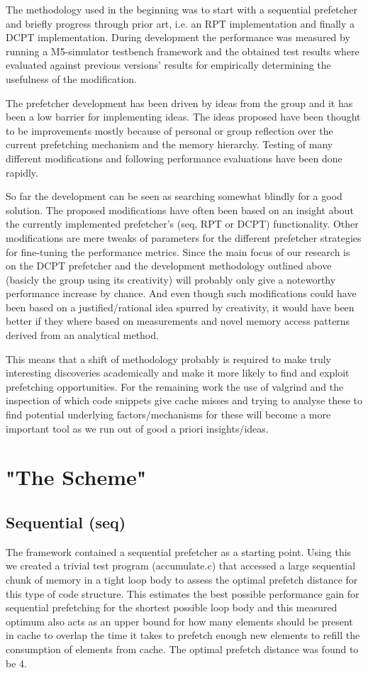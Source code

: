 \documentclass[12pt,journal,compsoc]{IEEEtran}
\begin{document}
The methodology used in the beginning was to start with a sequential
prefetcher and briefly progress through prior art, i.e. an RPT implementation
and finally a DCPT implementation. During development the performance was
measured by running a M5-simulator testbench framework and the obtained test
results where evaluated against previous versions' results for
empirically determining the usefulness of the modification.

The prefetcher development has been driven by ideas from the group and it
has been a low barrier for implementing ideas. The ideas proposed have been
thought to be improvements mostly because of personal or group reflection over
the current prefetching mechanism and the memory hierarchy. Testing of
many different modifications and following performance evaluations have been
done rapidly.

So far the development can be seen as searching somewhat blindly for a good
solution. The proposed modifications have often been based on an insight
about the currently implemented prefetcher's (seq, RPT or DCPT) functionality.
Other modifications are mere tweaks of parameters for the different prefetcher
strategies for fine-tuning the performance metrics. Since the main focus of
our research is on the DCPT prefetcher and the development methodology
outlined above (basicly the group using its creativity) will probably only
give a noteworthy performance increase by chance. And even though such
modifications could have been based on a justified/rational idea spurred by
creativity, it would have been better if they where based on measurements and
novel memory access patterns derived from an analytical method.

This means that a shift of methodology probably is required to make truly
interesting discoveries academically and make it more likely to find and
exploit prefetching opportunities. For the remaining work the use of valgrind
and the inspection of which code snippets give cache misses and trying to
analyse these to find potential underlying factors/mechanisms for these
will become a more important tool as we run out of good a priori
insights/ideas.

\section{"The Scheme"}
\subsection{Sequential (seq)}
The framework contained a sequential prefetcher as a starting point.
Using this we created a trivial test program (accumulate.c) that accessed
a large sequential chunk of memory in a tight loop body to assess the
optimal prefetch distance for this type of code structure.
This estimates the best possible performance gain for sequential
prefetching for the shortest possible loop body and this
measured optimum also acts as an upper bound for how many elements should
be present in cache to overlap the time it takes to prefetch enough new
elements to refill the consumption of elements from cache. The optimal
prefetch distance was found to be 4. %
\end{document}
